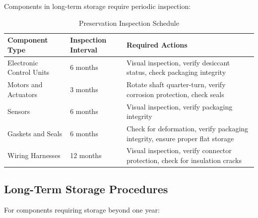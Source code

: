 \documentclass[12pt,a4paper,twoside,openright]{book}
\newcommand{\tabletextfont}{\normalfont\rmfamily}
\newcommand{\tableheadfont}{\normalfont\bfseries}
\begin{document}
Components in long-term storage require periodic inspection:

\begin{table}[h]
\centering
\setlength{\tabcolsep}{5pt} %
\begin{tabular}{|p{}|p{}|p{}|}
\hline
\tableheadfont\textbf{Component Type} & \tableheadfont\textbf{Inspection Interval} & \tableheadfont\textbf{Required Actions} \\
\hline
\tabletextfont Electronic Control Units & 6 months & Visual inspection, verify desiccant status, check packaging integrity \\
\hline
\tabletextfont Motors and Actuators & 3 months & Rotate shaft quarter-turn, verify corrosion protection, check seals \\
\hline
\tabletextfont Sensors & 6 months & Visual inspection, verify packaging integrity \\
\hline
\tabletextfont Gaskets and Seals & 6 months & Check for deformation, verify packaging integrity, ensure proper flat storage \\
\hline
\tabletextfont Wiring Harnesses & 12 months & Visual inspection, verify connector protection, check for insulation cracks \\
\hline
\end{tabular}
\caption{Preservation Inspection Schedule}
\end{table}

\subsection{Long-Term Storage Procedures}

For components requiring storage beyond one year:
\end{document}
